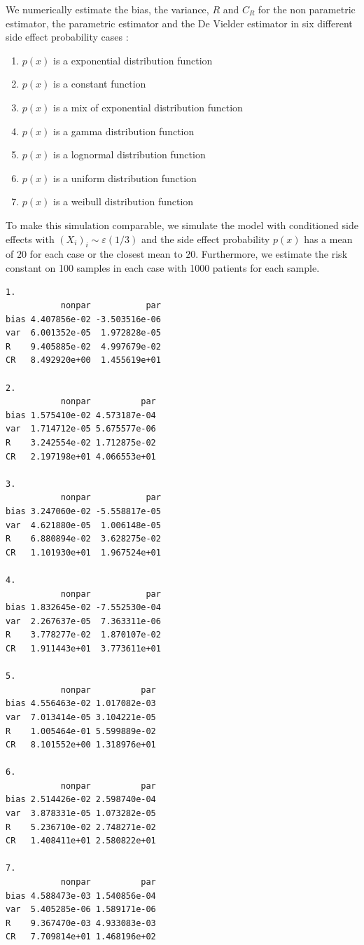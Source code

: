\documentclass[12pt,twoside]{article}
\begin{document}
We numerically estimate the bias, the variance, $R$ and $C_R$ for the non parametric estimator, 
the parametric estimator and the De Vielder estimator in six different side effect probability cases :
\begin{enumerate}
\item{$p(x)$ is a exponential distribution function}
\item{$p(x)$ is a constant function}
\item{$p(x)$ is a mix of exponential distribution function} 
\item{$p(x)$ is a gamma distribution function}
\item{$p(x)$ is a lognormal distribution function}
\item{$p(x)$ is a uniform distribution function}
\item{$p(x)$ is a weibull distribution function}
\end{enumerate}
To make this simulation comparable, we simulate the model with conditioned side effects with $(X_i)_i \sim \varepsilon(1/3)$ and the side effect probability $p(x)$ has a mean of $20$ for each case or the closest mean to $20$. Furthermore, we estimate the risk constant on 100 samples in each case
with 1000 patients for each sample.
\begin{verbatim}
1.
           nonpar           par
bias 4.407856e-02 -3.503516e-06
var  6.001352e-05  1.972828e-05
R    9.405885e-02  4.997679e-02
CR   8.492920e+00  1.455619e+01

2.
           nonpar          par
bias 1.575410e-02 4.573187e-04
var  1.714712e-05 5.675577e-06
R    3.242554e-02 1.712875e-02
CR   2.197198e+01 4.066553e+01

3.
           nonpar           par
bias 3.247060e-02 -5.558817e-05
var  4.621880e-05  1.006148e-05
R    6.880894e-02  3.628275e-02
CR   1.101930e+01  1.967524e+01

4.
           nonpar           par
bias 1.832645e-02 -7.552530e-04
var  2.267637e-05  7.363311e-06
R    3.778277e-02  1.870107e-02
CR   1.911443e+01  3.773611e+01

5.
           nonpar          par
bias 4.556463e-02 1.017082e-03
var  7.013414e-05 3.104221e-05
R    1.005464e-01 5.599889e-02
CR   8.101552e+00 1.318976e+01

6.
           nonpar          par
bias 2.514426e-02 2.598740e-04
var  3.878331e-05 1.073282e-05
R    5.236710e-02 2.748271e-02
CR   1.408411e+01 2.580822e+01

7.
           nonpar          par
bias 4.588473e-03 1.540856e-04
var  5.405285e-06 1.589171e-06
R    9.367470e-03 4.933083e-03
CR   7.709814e+01 1.468196e+02
\end{verbatim}
 
\end{document}
